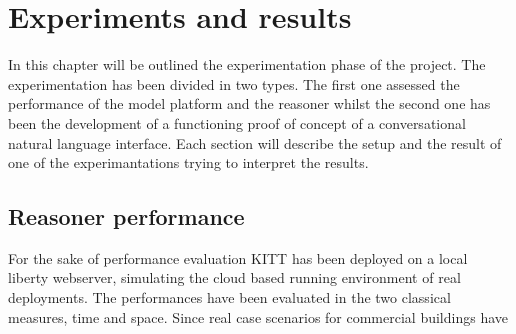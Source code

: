 \chapter{Experiments and results}
In this chapter will be outlined the experimentation phase of the project.
The experimentation has been divided in two types. The first one assessed the performance of the model platform and the reasoner whilst the second one has been the development of a functioning proof of concept of a conversational natural language interface.
Each section will describe the setup and the result of one of the experimantations trying to interpret the results.
\section{Reasoner performance}
For the sake of performance evaluation KITT has been deployed on a local liberty webserver, simulating the cloud based running environment of real deployments.
The performances have been evaluated in the two classical measures, time and space. Since real case scenarios for commercial buildings have 
